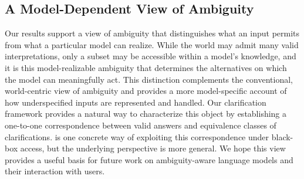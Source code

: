 \subsection{A Model-Dependent View of Ambiguity}
\label{subsec:closing}

Our results support a view of ambiguity that distinguishes what an input permits from what a particular model can realize. While the world may admit many valid interpretations, only a subset may be accessible within a model's knowledge, and it is this model-realizable ambiguity that determines the alternatives on which the model can meaningfully act. This distinction complements the conventional, world-centric view of ambiguity and provides a more model-specific account of how underspecified inputs are represented and handled. Our clarification framework provides a natural way to characterize this object by establishing a one-to-one correspondence between valid answers and equivalence classes of clarifications. \circleclar{} is one concrete way of exploiting this correspondence under black-box access, but the underlying perspective is more general. We hope this view provides a useful basis for future work on ambiguity-aware language models and their interaction with users.




